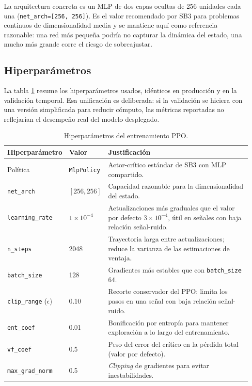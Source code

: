 \documentclass[IB,a4paper]{TFUOC}
\begin{document}
La arquitectura concreta es un MLP de dos capas ocultas de 256 unidades cada una (\texttt{net\_arch=[256, 256]}). Es el valor recomendado por SB3 para problemas continuos de dimensionalidad media y se mantiene aquí como referencia razonable: una red más pequeña podría no capturar la dinámica del estado, una mucho más grande corre el riesgo de sobreajustar.

\subsection{Hiperparámetros}

La tabla \ref{tab:ppo_params} resume los hiperparámetros usados, idénticos en producción y en la validación temporal. Esa unificación es deliberada: si la validación se hiciera con una versión simplificada para reducir cómputo, las métricas reportadas no reflejarían el desempeño real del modelo desplegado.

\begin{table}[h]
\centering
\renewcommand{\arraystretch}{1.25}
\begin{tabular}{|l|l|p{6.0cm}|}
\hline
\textbf{Hiperparámetro} & \textbf{Valor} & \textbf{Justificación} \\ \hline
Política & \texttt{MlpPolicy} & Actor-crítico estándar de SB3 con MLP compartido. \\ \hline
\texttt{net\_arch} & $[256, 256]$ & Capacidad razonable para la dimensionalidad del estado. \\ \hline
\texttt{learning\_rate} & $1\!\times\!10^{-4}$ & Actualizaciones más graduales que el valor por defecto $3\!\times\!10^{-4}$, útil en señales con baja relación señal-ruido. \\ \hline
\texttt{n\_steps} & 2048 & Trayectoria larga entre actualizaciones; reduce la varianza de las estimaciones de ventaja. \\ \hline
\texttt{batch\_size} & 128 & Gradientes más estables que con \texttt{batch\_size} 64. \\ \hline
\texttt{clip\_range} ($\epsilon$) & 0.10 & Recorte conservador del PPO; limita los pasos en una señal con baja relación señal-ruido. \\ \hline
\texttt{ent\_coef} & 0.01 & Bonificación por entropía para mantener exploración a lo largo del entrenamiento. \\ \hline
\texttt{vf\_coef} & 0.5 & Peso del error del crítico en la pérdida total (valor por defecto). \\ \hline
\texttt{max\_grad\_norm} & 0.5 & \textit{Clipping} de gradientes para evitar inestabilidades. \\ \hline
\end{tabular}
\caption{Hiperparámetros del entrenamiento PPO.}
\label{tab:ppo_params}
\end{table}
\end{document}
